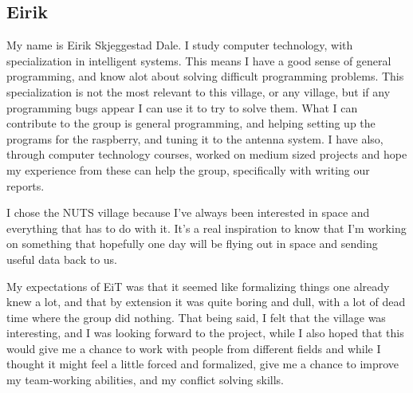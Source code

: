 \subsection{Eirik}
My name is Eirik Skjeggestad Dale. I study computer technology, with specialization in intelligent systems. This means I have a good sense of general programming, and know alot about solving difficult programming problems. This specialization is not the most relevant to this village, or any village, but if any programming bugs appear I can use it to try to solve them. What I can contribute to the group  is general programming, and helping setting up the programs for the raspberry, and tuning it to the antenna system. I have also, through computer technology courses, worked on medium sized projects and hope my experience from these can help the group, specifically with writing our reports.

I chose the NUTS village because I've always been interested in space and everything that has to do with it. It's a real inspiration to know that I'm working on something that hopefully one day will be flying out in space and sending useful data back to us.

My expectations of EiT was that it seemed like formalizing things one already knew a lot, and that by extension it was quite boring and dull, with a lot of dead time where the group did nothing. That being said, I felt that the village was interesting, and I was looking forward to the project, while I also hoped that this would give me a chance to work with people from different fields and while I thought it might feel a little forced and formalized, give me a chance to improve my team-working abilities, and my conflict solving skills.